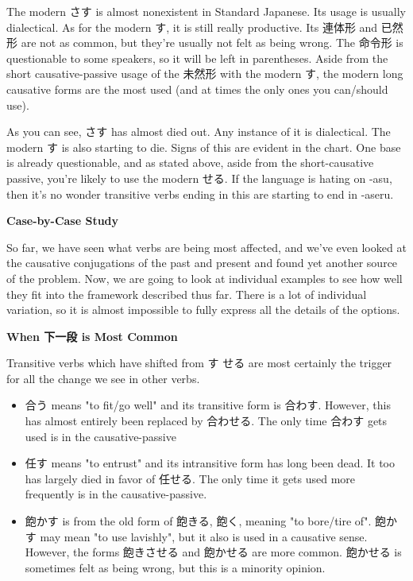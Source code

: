\par{ The modern さす is almost nonexistent in Standard Japanese. Its usage is usually dialectical. As for the modern す, it is still really productive. Its 連体形 and 已然形 are not as common, but they're usually not felt as being wrong. The 命令形 is questionable to some speakers, so it will be left in parentheses. Aside from the short causative-passive usage of the 未然形 with the modern す, the modern long causative forms are the most used (and at times the only ones you can\slash should use). }

\par{ As you can see, さす has almost died out. Any instance of it is dialectical. The modern す is also starting to die. Signs of this are evident in the chart. One base is already questionable, and as stated above, aside from the short-causative passive, you're likely to use the modern せる. If the language is hating on -asu, then it's no wonder transitive verbs ending in this are starting to end in -aseru. }

\begin{center}
\textbf{Case-by-Case Study }
\end{center}

\par{ So far, we have seen what verbs are being most affected, and we've even looked at the causative conjugations of the past and present and found yet another source of the problem. Now, we are going to look at individual examples to see how well they fit into the framework described thus far. There is a lot of individual variation, so it is almost impossible to fully express all the details of the options. }

\begin{center}
\textbf{When 下一段 is Most Common }
\end{center}

\par{ Transitive verbs which have shifted from す \textrightarrow  せる are most certainly the trigger for all the change we see in other verbs. }

\begin{itemize}

\item 合う means "to fit\slash go well" and its transitive form is 合わす. However, this has almost entirely been replaced by 合わせる. The only time 合わす gets used is in the causative-passive 
\item 任す means "to entrust" and its intransitive form has long been dead. It too has largely died in favor of 任せる. The only time it gets used more frequently is in the causative-passive. 
\item 飽かす is from the old form of 飽きる, 飽く, meaning "to bore\slash tire of". 飽かす may mean "to use lavishly", but it also is used in a causative sense. However, the forms 飽きさせる and 飽かせる are more common. 飽かせる is sometimes felt as being wrong, but this is a minority opinion. 
\end{itemize}

